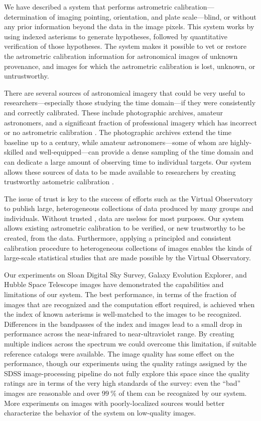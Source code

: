 We have described a system that performs astrometric
calibration---determination of imaging pointing, orientation, and
plate scale---blind, or without any prior information beyond the data
in the image pixels.  This system works by using indexed asterisms to
generate hypotheses, followed by quantitative verification of those
hypotheses.  The system makes it possible to vet or restore the
astrometric calibration information for astronomical images of unknown
provenance, and images for which the astrometric calibration is lost,
unknown, or untrustworthy.


There are several sources of astronomical imagery that could be very
useful to \linebreak[4] researchers---especially those studying the
time domain---if they were consistently and correctly calibrated.
These include photographic archives, amateur astronomers, and a
significant fraction of professional imagery which has incorrect or no
astrometric calibration \metadata.  The photographic archives extend
the time baseline up to a century, while amateur astronomers---some of
whom are highly-skilled and well-equipped---can provide a dense
sampling of the time domain and can dedicate a large amount of
observing time to individual targets.  Our system allows these sources
of data to be made available to researchers by creating trustworthy
astometric calibration \metadata.


The issue of trust is key to the success of efforts such as the
Virtual Observatory to publish large, heterogeneous collections of data
produced by many groups and individuals.  Without trusted \metadata,
data are useless for most purposes.  Our system allows existing
astrometric calibration \metadata to be verified, or new
trustworthy \metadata to be created, from the data.  Furthermore,
applying a principled and consistent calibration procedure to
heterogeneous collections of images enables the kinds of large-scale
statistical studies that are made possible by the Virtual Observatory.


Our experiments on Sloan Digital Sky Survey, Galaxy Evolution
Explorer, and Hubble Space Telescope images have demonstrated the
capabilities and limitations of our system.  The best performance, in
terms of the fraction of images that are recognized and the
computation effort required, is achieved when the index of known
asterisms is well-matched to the images to be recognized.  Differences
in the bandpasses of the index and images lead to a small drop in
performance across the near-infrared to near-ultraviolet range.  By
creating multiple indices across the spectrum we could overcome this
limitation, if suitable reference catalogs were available.  The image
quality has some effect on the performance, though our experiments
using the quality ratings assigned by the SDSS image-processing
pipeline do not fully explore this space since the quality ratings are
in terms of the very high standards of the survey: even the ``bad''
images are reasonable and over $99~\percent$ of them can be recognized
by our system.  More experiments on images with poorly-localized
sources would better characterize the behavior of the system on
low-quality images.


